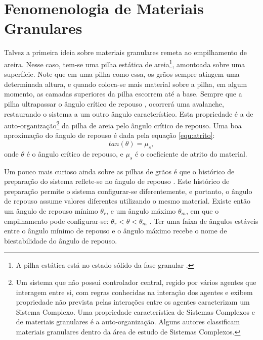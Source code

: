 \section{Fenomenologia de Materiais Granulares}
\label{subchap:Fenomenologia}

    Talvez a primeira ideia sobre materiais granulares remeta ao empilhamento de areira. Nesse caso, tem-se uma pilha estática de areia\footnote{A pilha estática está no estado sólido da fase granular \cite{Granular_Solids_Liquids_and_Gases}.}, amontoada sobre uma superfície. Note que em uma pilha como essa, os grãos sempre atingem uma determinada altura, e quando coloca-se mais material sobre a pilha, em algum momento, as camadas superiores da pilha escorrem até a base. Sempre que a pilha ultrapassar o ângulo crítico de repouso \cite{Granular_Physics}, ocorrerá uma avalanche, restaurando o sistema a um outro ângulo característico. Esta propriedade é a de auto-organização\footnote{Um sistema que não possui controlador central, regido por vários agentes que interagem entre si, com regras conhecidas na interação dos agentes e exibem propriedade não prevista pelas interações entre os agentes caracterizam um Sistema Complexo. Uma propriedade característica de Sistemas Complexos e de materiais granulares é a auto-organização. Alguns autores \cite{Mixing_and_Segregation_of_Granular_Materials, Measuring_the_flowing_properties_of_powders_and_grains, Revisiting_localized_deformation_in_sand_with_complex_systems, Granular_matter_and_networks, Patterns_and_collective_behavior_in_granular_media} classificam materiais granulares dentro da área de estudo de Sistemas Complexos.} da pilha de areia pelo ângulo crítico de repouso. Uma boa aproximação do ângulo de repouso é dada pela equação \ref{equ:atrito}:
\begin{equation}
    \label{equ:atrito}
    tan(\theta) = \mu _s ,
\end{equation}
onde $\theta$ é o ângulo crítico de repouso, e $\mu _s$ é o coeficiente de atrito do material.

    Um pouco mais curioso ainda sobre as pilhas de grãos é que o histórico de preparação do sistema reflete-se no ângulo de repouso \cite{Dynamics_at_the_angle_of_repose}. Este histórico de preparação permite o sistema configurar-se diferentemente, e portanto, o ângulo de repouso assume valores diferentes utilizando o mesmo material. Existe então um ângulo de repouso mínimo $\theta _r$, e um ângulo máximo $\theta _m$, em que o empilhamento pode configurar-se: $\theta _r < \theta < \theta _m$ \cite{Granular_Physics}. Ter uma faixa de ângulos estáveis entre o ângulo mínimo de repouso e o ângulo máximo recebe o nome de biestabilidade do ângulo de repouso.


